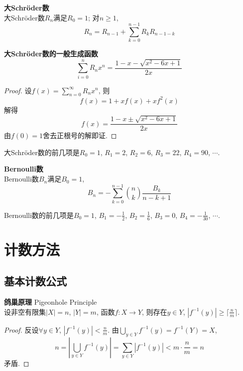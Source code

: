 \begin{dfn} \textbf{大Schröder数}\\
大Schröder数$R_n$满足$R_0=1$; 对$n\ge 1$, 
\begin{equation}
    R_n = R_{n-1} + \sum_{k=0}^{n-1} R_kR_{n-1-k}
\end{equation} 
\end{dfn}

\begin{pro}\textbf{大Schröder数的一般生成函数}\\
\begin{equation}
    \sum_{i=0}^n R_n x^n = \frac{1-x -  \sqrt{x^2-6x+1}}{2x}
\end{equation}
\end{pro}
\begin{proof}
设$f(x) = \sum_{n=0}^\infty R_n x^n$, 则\begin{equation*}
    f(x) = 1 + xf(x) + xf^2(x)
\end{equation*}
解得
\begin{equation*}
    f(x) = \frac{1-x\pm \sqrt{x^2-6x+1}}{2x}
\end{equation*}
由$f(0)=1$舍去正根号的解即证. 
\end{proof}


大Schröder数的前几项是$R_0=1$, $R_1=2$, $R_2=6$, $R_3=22$, $R_4=90$, $\cdots$. 

\begin{dfn} \textbf{Bernoulli数}\\
Bernoulli数$B_n$满足$B_0=1$, 
\begin{equation}
    B_n =-\sum_{k=0}^{n-1}\binom{n}{k}\frac{B_k}{n-k+1}
\end{equation}
\end{dfn}
\par Bernoulli数的前几项是$B_0=1$, $B_1=-\frac{1}{2}$, $B_2=\frac{1}{6}$, $B_3=0$, $B_4=-\frac{1}{30}$, $\cdots$. 

\section{计数方法}

\subsection{基本计数公式}

\begin{pro} \textbf{鸽巢原理} Pigeonhole Principle \\
设非空有限集$|X|=n$, $|Y|=m$, 函数$f:X\to Y$, 则存在$y\in Y$, $|f^{-1}(y)|\ge \lceil\frac{n}{m}\rceil$. 
\end{pro}
\begin{proof}
反设$\forall y\in Y$, $|f^{-1}(y)| < \frac{n}{m}$. 由$\bigcup_{y\in Y}f^{-1}(y)=f^{-1}(Y)=X$, 
\begin{equation}
    n = \left| \bigcup_{y\in Y}f^{-1}(y) \right|=\sum_{y\in Y}|f^{-1}(y)|<m\cdot \frac{n}{m}=n
\end{equation}
矛盾. 
\end{proof}


